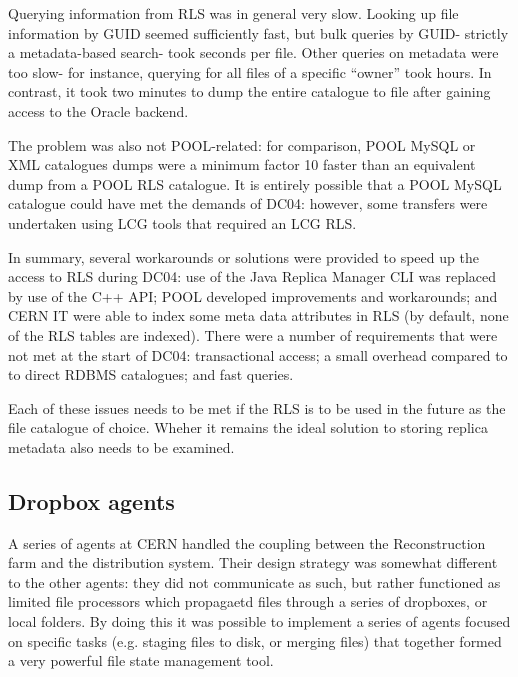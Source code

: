\documentclass{cmspaper}
\begin{document}
Querying information from RLS was in general very slow. Looking up
file information by GUID seemed sufficiently fast, but bulk queries by
GUID- strictly a metadata-based search- took seconds per file. Other
queries on metadata were too slow- for instance, querying for all
files of a specific ``owner'' took hours. In contrast, it took two
minutes to dump the entire catalogue to file after gaining access to
the Oracle backend.

The problem was also not POOL-related: for comparison, POOL MySQL or
XML catalogues dumps were a minimum factor 10 faster than an
equivalent dump from a POOL RLS catalogue. It is entirely possible
that a POOL MySQL catalogue could have met the demands of DC04:
however, some transfers were undertaken using LCG tools that required
an LCG RLS.

In summary, several workarounds or solutions were provided to speed up
the access to RLS during DC04: use of the Java Replica Manager CLI was
replaced by use of the C++ API; POOL developed improvements and
workarounds; and CERN IT were able to index some meta data attributes
in RLS (by default, none of the RLS tables are indexed). There were a
number of requirements that were not met at the start of DC04:
transactional access; a small overhead compared to to direct RDBMS
catalogues; and fast queries.

Each of these issues needs to be met if the RLS is to be used in the
future as the file catalogue of choice. Wheher it remains the ideal
solution to storing replica metadata also needs to be examined.

\subsection{Dropbox agents}
A series of agents at CERN handled the coupling between the
Reconstruction farm and the distribution system. Their design strategy
was somewhat different to the other agents: they did not communicate
as such, but rather functioned as limited file processors which
propagaetd files through a series of dropboxes, or local folders. By
doing this it was possible to implement a series of agents focused on
specific tasks (e.g. staging files to disk, or merging files) that
together formed a very powerful file state management tool.
\end{document}
